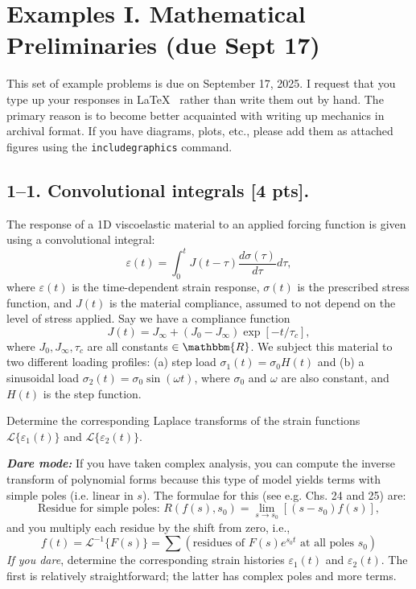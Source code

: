 

\section*{Examples I. Mathematical Preliminaries (due Sept 17)}
\label{PS1}

This set of example problems is due on September 17, 2025. 
I request that you type up your responses in \LaTeX~ rather than write them out by hand. 
The primary reason is to become better acquainted with writing up mechanics in archival format. 
If you have diagrams, plots, etc., please add them as attached figures using the \texttt{includegraphics} command. 

\bigskip
\subsection*{1--1. \textbf{Convolutional integrals} [4 pts].} The response of a 1D viscoelastic material to an applied forcing function is given using a convolutional integral:
\begin{equation}
    \varepsilon(t) = \int_0^t J(t-\tau) \frac{d\sigma(\tau)}{d\tau} d\tau,
\end{equation}
where $\varepsilon(t)$ is the time-dependent strain response, $\sigma(t)$ is the prescribed stress function, and $J(t)$ is the material compliance, assumed to not depend on the level of stress applied. 
Say we have a compliance function 
\begin{equation}
    J(t) = J_\infty + (J_0-J_\infty)\exp[-t/\tau_c],
\end{equation}
where $J_0, J_\infty, \tau_c$ are all constants $\in \mathbbm{R}$. 
We subject this material to two different loading profiles: (a) step load $\sigma_1(t) = \sigma_0 H(t)$ and (b) a sinusoidal load $\sigma_2(t) = \sigma_0  \sin(\omega t)$, where $\sigma_0$ and $\omega$ are also constant, and $H(t)$ is the step function. 

Determine the corresponding Laplace transforms of the strain functions $\mathcal{L}\{\varepsilon_1(t)\}$ and $\mathcal{L}\{\varepsilon_2(t)\}$. 

\textit{\textbf{Dare mode:}} If you have taken complex analysis, you can compute the inverse transform of polynomial forms because this type of model yields terms with simple poles (i.e. linear in $s$). 
The formulae for this (see e.g. \cite{rileyMathematicalMethodsPhysics2006} Chs. 24 and 25) are:
\begin{equation*}
    \textrm{Residue for simple poles: } R(f(s),s_0) = \lim\limits_{s\rightarrow s_0} \left[ (s-s_0) f(s) \right],
\end{equation*}
and you multiply each residue by the shift from zero, i.e.,
\begin{equation*}
    f(t) = \mathcal{L}^{-1}\{F(s)\} = \sum \left( \textrm{residues of } F(s)e^{s_0 t} \textrm{ at all poles } s_0 \right)
\end{equation*}
\textit{If you dare}, determine the corresponding strain histories $\varepsilon_1(t)$ and $\varepsilon_2(t)$. The first is relatively straightforward; the latter has complex poles and more terms. 

